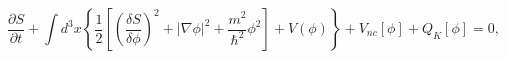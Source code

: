 \begin{equation}
\frac{\partial S}{\partial t}+\int d^{3}x\left\{  \frac{1}{2}\left[  \left(
\frac{\delta S}{\delta\phi}\right)  ^{2}+\left|  \nabla\phi\right|  ^{2}%
+\frac{m^{2}}{\hbar^{2}}\phi^{2}\right]  +V\left(  \phi\right)  \right\}
+V_{nc}[\phi]+Q_{K}[\phi]=0,\label{19}%
\end{equation}

